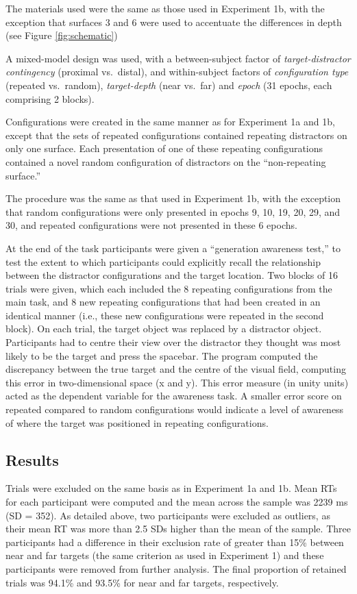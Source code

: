 \documentclass[
  english,
  man,floatsintext]{apa7}
\begin{document}
The materials used were the same as those used in Experiment 1b, with the exception that surfaces 3 and 6 were used to accentuate the differences in depth (see Figure \ref{fig:schematic})

A mixed-model design was used, with a between-subject factor of \emph{target-distractor contingency} (proximal vs.~distal), and within-subject factors of \emph{configuration type} (repeated vs.~random), \emph{target-depth} (near vs.~far) and \emph{epoch} (31 epochs, each comprising 2 blocks).

Configurations were created in the same manner as for Experiment 1a and 1b, except that the sets of repeated configurations contained repeating distractors on only one surface. Each presentation of one of these repeating configurations contained a novel random configuration of distractors on the ``non-repeating surface.''

The procedure was the same as that used in Experiment 1b, with the exception that random configurations were only presented in epochs 9, 10, 19, 20, 29, and 30, and repeated configurations were not presented in these 6 epochs.

At the end of the task participants were given a ``generation awareness test,'' to test the extent to which participants could explicitly recall the relationship between the distractor configurations and the target location. Two blocks of 16 trials were given, which each included the 8 repeating configurations from the main task, and 8 new repeating configurations that had been created in an identical manner (i.e., these new configurations were repeated in the second block). On each trial, the target object was replaced by a distractor object. Participants had to centre their view over the distractor they thought was most likely to be the target and press the spacebar. The program computed the discrepancy between the true target and the centre of the visual field, computing this error in two-dimensional space (x and y). This error measure (in unity units) acted as the dependent variable for the awareness task. A smaller error score on repeated compared to random configurations would indicate a level of awareness of where the target was positioned in repeating configurations.

\hypertarget{results-1}{%
\subsection{Results}\label{results-1}}

Trials were excluded on the same basis as in Experiment 1a and 1b. Mean RTs for each participant were computed and the mean across the sample was 2239 ms (SD = 352). As detailed above, two participants were excluded as outliers, as their mean RT was more than 2.5 SDs higher than the mean of the sample. Three participants had a difference in their exclusion rate of greater than 15\% between near and far targets (the same criterion as used in Experiment 1) and these participants were removed from further analysis. The final proportion of retained trials was 94.1\% and 93.5\% for near and far targets, respectively.
\end{document}
